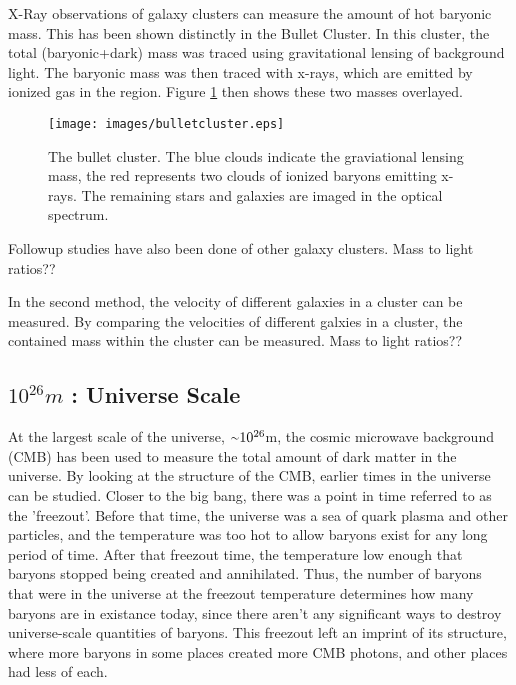     X-Ray observations of galaxy clusters can measure the amount of hot baryonic mass.
    This has been shown distinctly in the Bullet Cluster\cite{bullet_cluster}.
    In this cluster, the total (baryonic+dark) mass was traced using gravitational lensing of background light.
    The baryonic mass was then traced with x-rays, which are emitted by ionized gas in the region.
    Figure \ref{fig:bullet} then shows these two masses overlayed.

    \begin{figure}[ht]
      \begin{center}
        \texttt{[image: images/bulletcluster.eps]}
        \caption[The Bullet Cluster]{The bullet cluster\cite{bullet_cluster_combined_image}.  The blue clouds indicate the graviational lensing mass\cite{bullet_cluster}, the red represents two clouds of ionized baryons emitting x-rays\cite{bullet_cluster_chandramap}.  The remaining stars and galaxies are imaged in the optical spectrum\cite{bullet_cluster_composite}.}\label{fig:bullet}
      \end{center}
    \end{figure}

    Followup studies have also been done of other galaxy clusters.
    Mass to light ratios??


    In the second method, the velocity of different galaxies in a cluster can be measured.
    By comparing the velocities of different galxies in a cluster, the contained mass within the cluster can be measured.
    Mass to light ratios??

  \subsection{$10^{26}m$ : Universe Scale}
    At the largest scale of the universe, $\nicetilde 10^{26}$m, the cosmic microwave background (CMB) has been used to measure the total amount of dark matter in the universe.
    By looking at the structure of the CMB, earlier times in the universe can be studied.
    Closer to the big bang, there was a point in time referred to as the 'freezout'.
    Before that time, the universe was a sea of quark plasma and other particles, and the temperature was too hot to allow baryons exist for any long period of time.
    After that freezout time, the temperature low enough that baryons stopped being created and annihilated.
    Thus, the number of baryons that were in the universe at the freezout temperature determines how many baryons are in existance today, since there aren't any significant ways to destroy universe-scale quantities of baryons.
    This freezout left an imprint of its structure, where more baryons in some places created more CMB photons, and other places had less of each.

